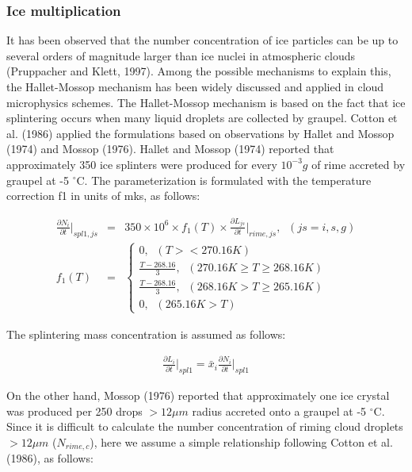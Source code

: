 \subsubsection{Ice multiplication}
It has been observed that the number concentration of ice particles can be up to several orders of magnitude larger than ice nuclei in atmospheric clouds (Pruppacher and Klett, 1997). Among the possible mechanisms to explain this, the Hallet-Mossop mechanism has been widely discussed and applied in cloud microphysics schemes. The Hallet-Mossop mechanism is based on the fact that ice splintering occurs when many liquid droplets are collected by graupel. Cotton et al. (1986) applied the formulations based on observations by Hallet and Mossop (1974) and Mossop (1976).
Hallet and Mossop (1974) reported that approximately 350 ice splinters were produced for every $10^{-3} g$ of rime accreted by graupel at -5 $^\circ$C. The parameterization is formulated with the temperature correction f1 in units of mks, as follows:

\begin{eqnarray}
\frac{\partial N_{i}}{\partial t}\Bigr|_{spl1,js}&=&350\times 10^{6}\times f_{1}(T)\times\frac{\partial L_{js}}{\partial t}\Bigr|_{rime,js},\;\;(js=i,s,g)\label{sn212}\\
f_{1}(T)&=&
\left\{
\begin{array}{l}
0,\;\;(T><270.16K) \\
\frac{T-268.16}{3},\;\;(270.16K \geq T \geq 268.16K) \\
\frac{T-268.16}{3},\;\;(268.16K > T \geq 265.16K) \\
0,\;\;(265.16K>T)
\label{sn213}
\end{array}
\right.
\end{eqnarray}

The splintering mass concentration is assumed as follows:

\begin{eqnarray}
\frac{\partial L_{i}}{\partial t}\Bigr|_{spl1}=\bar{x}_{i}\frac{\partial N_{i}}{\partial t}\Bigr|_{spl1}\label{sn214}
\end{eqnarray}

On the other hand, Mossop (1976) reported that approximately one ice crystal was produced per 250 drops $> 12 \mu m$ radius accreted onto a graupel at -5 $^\circ$C. Since it is difficult to calculate the number concentration of riming cloud droplets $> 12 \mu m$ ($N_{rime,c}$), here we assume a simple relationship following Cotton et al. (1986), as follows:

